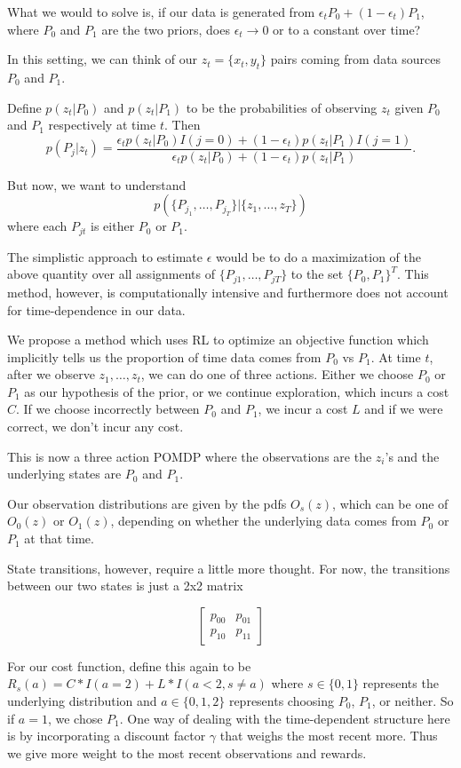 \documentclass[english]{article}
\numberwithin{equation}{section}
\begin{document}
What we would to solve is, if our data is generated from $\epsilon_t P_0 + (1-\epsilon_t) P_1$, where $P_0$ and $P_1$ are the two priors, does $\epsilon_t\to 0$ or to a constant over time?

In this setting, we can think of our $z_t=\{x_t,y_t\}$ pairs coming from data sources $P_0$ and $P_1$.

Define $p(z_t|P_0)$ and $p(z_t|P_1)$ to be the probabilities of observing $z_t$ given $P_0$ and $P_1$ respectively at time $t$. Then $$p(P_j|z_t)=\frac{\epsilon_t p(z_t|P_0) I(j=0) + (1-\epsilon_t) p(z_t|P_1) I(j=1)}{\epsilon_t p(z_t|P_0) + (1-\epsilon_t) p(z_t|P_1)}.$$

But now, we want to understand
$$p(\{P_{j_1},\ldots,P_{j_T}\}|\{z_1,\ldots,z_T\})$$ where each $P_{jt}$ is either $P_0$ or $P_1$.

The simplistic approach to estimate $\epsilon$ would be to do a maximization of the above quantity over all assignments of $\{P_{j1},\ldots,P_{jT}\}$ to the set $\{P_0,P_1\}^T$. This method, however, is computationally intensive and furthermore does not account for time-dependence in our data.

We propose a method which uses RL to optimize an objective function which implicitly tells us the proportion of time data comes from $P_0$ vs $P_1$. At time $t$, after we observe $z_1,\ldots,z_t$, we can do one of three actions. Either we choose $P_0$ or $P_1$ as our hypothesis of the prior, or we continue exploration, which incurs a cost $C$. If we choose incorrectly between $P_0$ and $P_1$, we incur a cost $L$ and if we were correct, we don't incur any cost.

This is now a three action POMDP where the observations are the $z_i$'s and the underlying states are $P_0$ and $P_1$.

Our observation distributions are given by the pdfs $O_s(z)$, which can be one of $O_0(z)$ or $O_1(z)$, depending on whether the underlying data comes from $P_0$ or $P_1$ at that time.

State transitions, however, require a little more thought. For now, the transitions between our two states is just a 2x2 matrix

$$
\begin{bmatrix}
p_{00} & p_{01} \\ 
p_{10} & p_{11} 
\end{bmatrix}
$$

For our cost function, define this again to be $R_s(a)=C*I(a=2)+L*I(a<2,s\neq a)$ where $s\in \{0,1\}$ represents the underlying distribution and $a\in \{0,1,2\}$ represents choosing $P_0$, $P_1$, or neither. So if $a=1$, we chose $P_1$. One way of dealing with the time-dependent structure here is by incorporating a discount factor $\gamma$ that weighs the most recent more. Thus we give more weight to the most recent observations and rewards.
\end{document}
